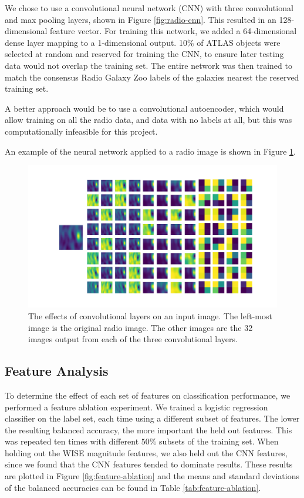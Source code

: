       We chose to use a convolutional neural network (CNN) with three
      convolutional and max pooling layers, shown in Figure \ref{fig:radio-cnn}.
      This resulted in an 128-dimensional feature vector. For training this
      network, we added a 64-dimensional dense layer mapping to a 1-dimensional
      output. 10\% of ATLAS objects were selected at random and reserved for
      training the CNN, to ensure later testing data would not overlap the
      training set. The entire network was then trained to match the consensus
      Radio Galaxy Zoo labels of the galaxies nearest the reserved training set.

      A better approach would be to use a convolutional autoencoder, which would
      allow training on all the radio data, and data with no labels at all, but
      this was computationally infeasible for this project.

      An example of the neural network applied to a radio image is shown in
      Figure \ref{fig:rgz-cnn}.

      \begin{figure}[!ht]
        \centering
        \includegraphics[width=\textwidth]{images/rgz_cnn}
        \caption{The effects of convolutional layers on an input image. The
          left-most image is the original radio image. The other images are the
          32 images output from each of the three convolutional layers.}
        \label{fig:rgz-cnn}
      \end{figure}

  \subsection{Feature Analysis}
  \label{sec:feature-analysis}

    To determine the effect of each set of features on classification
    performance, we performed a feature ablation experiment. We trained a
    logistic regression classifier on the \citeauthor{norris06} label set, each
    time using a different subset of features. The lower the resulting balanced
    accuracy, the more important the held out features. This was repeated ten
    times with different $50\%$ subsets of the training set. When holding out
    the WISE magnitude features, we also held out the CNN features, since we
    found that the CNN features tended to dominate results. These results are
    plotted in Figure \ref{fig:feature-ablation} and the means and standard
    deviations of the balanced accuracies can be found in Table
    \ref{tab:feature-ablation}.

